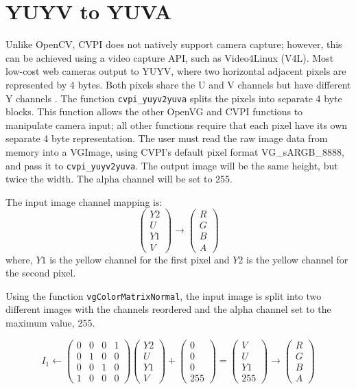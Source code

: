 \documentclass[12pt]{report}
\begin{document}
\section{YUYV to YUVA}
\label{sec-3-4}
Unlike OpenCV, CVPI does not natively support camera capture; however,
this can be achieved using a video capture API, such as Video4Linux
(V4L). Most low-cost web cameras output to YUYV, where two horizontal
adjacent pixels are represented by 4 bytes. Both pixels share the U
and V channels but have different Y channels \cite{videoForLinux}. The
function {\tt cvpi\_yuyv2yuva} splits the pixels into separate 4 byte
blocks. This function allows the other OpenVG and CVPI functions to
manipulate camera input; all other functions require that each pixel
have its own separate 4 byte representation. The user must read the
raw image data from memory into a VGImage, using CVPI's default pixel
format VG\_sARGB\_8888, and pass it to {\tt cvpi\_yuyv2yuva}. The
output image will be the same height, but twice the width. The alpha
channel will be set to 255.

The input image channel mapping is:
 \[\begin{pmatrix} Y2 \\ U \\ Y1 \\ V \end{pmatrix}
 \rightarrow
\begin{pmatrix} R \\ G \\ B \\ A \end{pmatrix} \]
where, $Y1$ is the yellow channel for the first pixel and $Y2$
is the yellow channel for the second pixel.

Using the function {\tt vgColorMatrixNormal}, the input image is split into
two different images with the channels reordered and the alpha
channel set to the maximum value, 255.

\[I_1 \gets \begin{pmatrix} 0 & 0 & 0 & 1 \\ 0 & 1 & 0 & 0 \\ 0 & 0 & 1 & 0 \\ 1 & 0 & 0 & 0 \end{pmatrix}
\begin{pmatrix} Y2 \\ U \\ Y1 \\ V \end{pmatrix} + \begin{pmatrix}
0 \\ 0 \\ 0 \\ 255 \end{pmatrix} =\begin{pmatrix} V \\ U \\ Y1 \\ 255 \end{pmatrix}\to \begin{pmatrix} R \\ G \\ B \\ A \end{pmatrix}
\]
\end{document}

